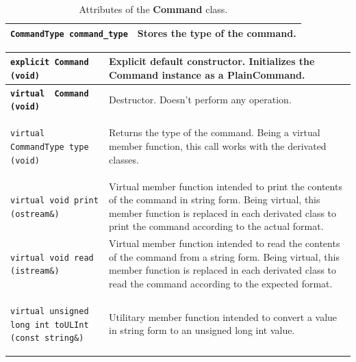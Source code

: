 \documentclass[11pt,twoside,openany,x11names,svgnames]{memoir}
\begin{document}
\begin{table}[h]\footnotesize
\centering
\begin{tabular}{| >{\bfseries}p{6.5cm} | p{9cm} |}
	\hline
	
	\texttt{CommandType command\_type} & Stores the type of the command. \\

	\hline
\end{tabular}
\caption{Attributes of the \textbf{Command} class.}
\label{tab:Command-Attributes}
\end{table}

\begin{table}[h]\footnotesize
\centering
\begin{tabular}{| >{\bfseries}p{8.5cm} | p{7cm} |}
	\hline
	
	\texttt{explicit Command (void)} & Explicit default constructor. Initializes the Command instance as a PlainCommand. \\
	
	\hline
	
	\texttt{virtual ~Command (void)} & Destructor. Doesn't perform any operation. \\
	
	\hline
	
	\texttt{virtual CommandType type (void)} & Returns the type of the command. Being a virtual member function, this call works with the derivated classes. \\
	
	\hline	
	
	\texttt{virtual void print (ostream\&)} & Virtual member function intended to print the contents of the command in string form. Being virtual, this member function is replaced in each derivated class to print the command according to the actual format. \\
	
	\hline
	
	\texttt{virtual void read (istream\&)} & Virtual member function intended to read the contents of the command from a string form. Being virtual, this member function is replaced in each derivated class to read the command according to the expected format. \\
	
	\hline	
	
	\texttt{virtual unsigned long int toULInt (const string\&)} & Utilitary member function intended to convert a value in string form to an unsigned long int value. \\
	

\end{tabular}
\end{table}
\end{document}
